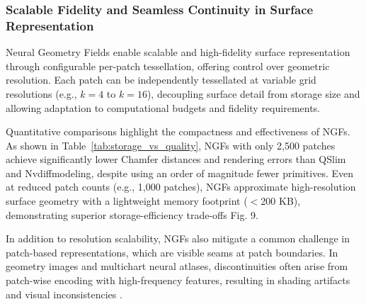 \subsubsection{Scalable Fidelity and Seamless Continuity in Surface Representation}

Neural Geometry Fields enable scalable and high-fidelity surface representation through configurable per-patch tessellation, offering control over geometric resolution. 
Each patch can be independently tessellated at variable grid resolutions (e.g., $k=4$ to $k=16$), decoupling surface detail from storage size and allowing adaptation to computational budgets and fidelity requirements. 

Quantitative comparisons highlight the compactness and effectiveness of NGFs. 
As shown in Table~\ref{tab:storage_vs_quality}, NGFs with only 2,500 patches achieve significantly lower Chamfer distances and rendering errors than QSlim and Nvdiffmodeling, despite using an order of magnitude fewer primitives. 
Even at reduced patch counts (e.g., 1,000 patches), NGFs approximate high-resolution surface geometry with a lightweight memory footprint ($<$200 KB), demonstrating superior storage-efficiency trade-offs \cite{sivaram2024} Fig. 9. 

\begin{table}[h]
\caption{Comparison of storage efficiency and visual quality for the Ganesha model. Chamfer distances are scaled by $10^5$ and rendering errors by $10^{-3}$. Based on data from \cite{sivaram2024}, Table 2 and Fig. 7.}
\centering
{}
\label{tab:storage_vs_quality}
\end{table}

In addition to resolution scalability, NGFs also mitigate a common challenge in patch-based representations, which are visible seams at patch boundaries. 
In geometry images and multichart neural atlases, discontinuities often arise from patch-wise encoding with high-frequency features, resulting in shading artifacts and visual inconsistencies \cite{Gu2002}. 


